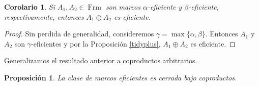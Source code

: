 \documentclass[11pt]{amsart}
\DeclareMathOperator{\Frm}{Frm}
\theoremstyle{plain}
\newtheorem{cor}[thm]{Corolario}
\newtheorem{prop}[thm]{Proposición}
\theoremstyle{definition}
\begin{document}
\begin{cor}\label{Paso 3}
Si $A_1, A_2\in \Frm$ son marcos $\alpha$-eficiente y $\beta$-eficiente, respectivamente, entonces $A_1\oplus A_2$ es eficiente.
\end{cor}

\begin{proof}
Sin perdida de generalidad, consideremos $\gamma=\max\{\alpha, \beta\}$. Entonces $A_1$ y $A_2$ son $\gamma$-eficientes y por la Proposición \ref{tidyplus}, $A_1\oplus A_2$ es eficiente.
\end{proof}

Generalizamos el resultado anterior a coproductos arbitrarios.
\begin{prop}\label{coprodE}
La clase de marcos eficientes es cerrada bajo coproductos.
\end{prop}
\end{document}

